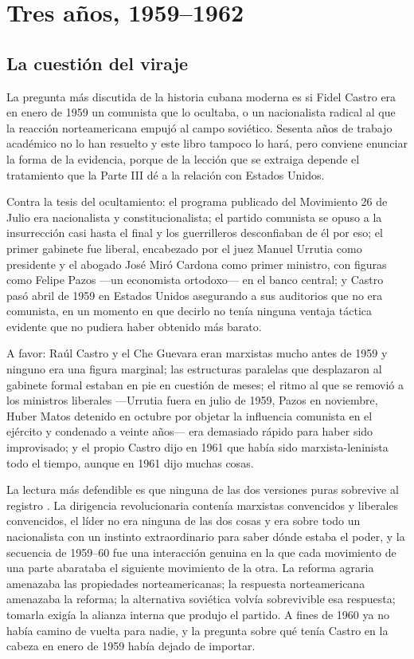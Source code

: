 \chapter{Tres años, 1959--1962}
\label{ch:revolution}

\section{La cuestión del viraje}

La pregunta más discutida de la historia cubana moderna es si Fidel Castro era en
enero de 1959 un comunista que lo ocultaba, o un nacionalista radical al que la
reacción norteamericana empujó al campo soviético. Sesenta años de trabajo
académico no lo han resuelto y este libro tampoco lo hará, pero conviene enunciar
la forma de la evidencia, porque de la lección que se extraiga depende el
tratamiento que la Parte III dé a la relación con Estados Unidos.

Contra la tesis del ocultamiento: el programa publicado del Movimiento 26 de
Julio era nacionalista y constitucionalista; el partido comunista se opuso a la
insurrección casi hasta el final y los guerrilleros desconfiaban de él por eso;
el primer gabinete fue liberal, encabezado por el juez Manuel Urrutia como
presidente y el abogado José Miró Cardona como primer ministro, con figuras como
Felipe Pazos ---un economista ortodoxo--- en el banco central; y Castro pasó
abril de 1959 en Estados Unidos asegurando a sus auditorios que no era comunista,
en un momento en que decirlo no tenía ninguna ventaja táctica evidente que no
pudiera haber obtenido más barato.

A favor: Raúl Castro y el Che Guevara eran marxistas mucho antes de 1959 y
ninguno era una figura marginal; las estructuras paralelas que desplazaron al
gabinete formal estaban en pie en cuestión de meses; el ritmo al que se removió a
los ministros liberales ---Urrutia fuera en julio de 1959, Pazos en noviembre,
Huber Matos detenido en octubre por objetar la influencia comunista en el
ejército y condenado a veinte años--- era demasiado rápido para haber sido
improvisado; y el propio Castro dijo en 1961 que había sido marxista-leninista
todo el tiempo, aunque en 1961 dijo muchas cosas.

La lectura más defendible es que ninguna de las dos versiones puras sobrevive al
registro \citep{farber2006}. La dirigencia revolucionaria contenía marxistas
convencidos y liberales convencidos, el líder no era ninguna de las dos cosas y
era sobre todo un nacionalista con un instinto extraordinario para saber dónde
estaba el poder, y la secuencia de 1959--60 fue una interacción genuina en la que
cada movimiento de una parte abarataba el siguiente movimiento de la otra. La
reforma agraria amenazaba las propiedades norteamericanas; la respuesta
norteamericana amenazaba la reforma; la alternativa soviética volvía sobrevivible
esa respuesta; tomarla exigía la alianza interna que produjo el partido. A fines
de 1960 ya no había camino de vuelta para nadie, y la pregunta sobre qué tenía
Castro en la cabeza en enero de 1959 había dejado de importar.

